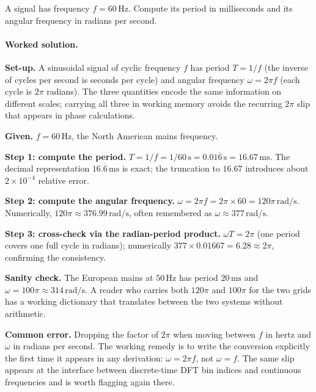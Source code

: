 \begin{exercise}
A signal has frequency $f = 60 \,\si{\hertz}$. Compute its period in
milliseconds and its angular frequency in radians per second.

\paragraph{Worked solution.}
\textbf{Set-up.} A sinusoidal signal of cyclic frequency $f$ has
period $T = 1/f$ (the inverse of cycles per second is seconds per
cycle) and angular frequency $\omega = 2\pi f$ (each cycle is
$2\pi$ radians). The three quantities encode the same information
on different scales; carrying all three in working memory avoids
the recurring $2\pi$ slip that appears in phase calculations.

\textbf{Given.} $f = 60 \,\si{\hertz}$, the North American mains
frequency.

\textbf{Step 1: compute the period.} $T = 1/f = 1/60 \,\si{\second}
= 0.01\overline{6} \,\si{\second} = 16.67 \,\si{\milli\second}$.
The decimal representation $16.\overline{6} \,\si{\milli\second}$
is exact; the truncation to $16.67$ introduces about
$2 \times 10^{-4}$ relative error.

\textbf{Step 2: compute the angular frequency.} $\omega = 2\pi f =
2\pi \times 60 = 120\pi \,\si{\radian\per\second}$. Numerically,
$120\pi \approx 376.99 \,\si{\radian\per\second}$, often
remembered as $\omega \approx 377 \,\si{\radian\per\second}$.

\textbf{Step 3: cross-check via the radian-period product.}
$\omega T = 2\pi$ (one period covers one full cycle in radians);
numerically $377 \times 0.01667 = 6.28 \approx 2\pi$, confirming
the consistency.

\textbf{Sanity check.} The European mains at $50 \,\si{\hertz}$
has period $20 \,\si{\milli\second}$ and $\omega = 100\pi \approx
314 \,\si{\radian\per\second}$. A reader who carries both
$120\pi$ and $100\pi$ for the two grids has a working dictionary
that translates between the two systems without arithmetic.

\textbf{Common error.} Dropping the factor of $2\pi$ when moving
between $f$ in hertz and $\omega$ in radians per second. The
working remedy is to write the conversion explicitly the first
time it appears in any derivation: $\omega = 2\pi f$, not
$\omega = f$. The same slip appears at the interface between
discrete-time DFT bin indices and continuous frequencies and is
worth flagging again there.
\end{exercise}

